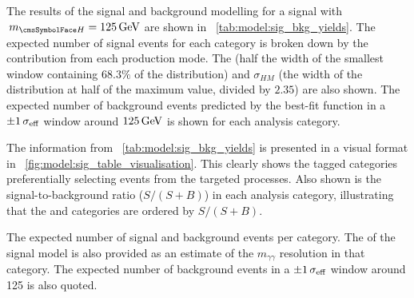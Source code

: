 
The results of the signal and background modelling for a signal with $\mH=125\GeV$ are shown in \Table~\ref{tab:model:sig_bkg_yields}. The expected number of signal events for each category is broken down by the contribution from each production mode. The \effSigma (half the width of the smallest window containing $68.3\%$ of the distribution) and $\sigma_{HM}$ (the width of the distribution at half of the maximum value, divided by $2.35$) are also shown. The expected number of background events predicted by the best-fit function in a $\pm 1 \,\sigma_{\text{eff}}$ window around $125\,\text{Ge\hspace{-.08em}V}$ is shown for each analysis category. 

The information from \Table~\ref{tab:model:sig_bkg_yields} is presented in a visual format in \Fig~\ref{fig:model:sig_table_visualisation}. This clearly shows the tagged categories preferentially selecting events from the targeted processes. Also shown is the signal-to-background ratio ($S/(S+B)$) in each analysis category, illustrating that the \Untagged and \VBFTag categories are ordered by $S/(S+B)$. 

 \begin{table}
  \resizebox{\textwidth}{!}{

}
 \caption{ The expected number of signal and background events per category. The \effSigma of the signal model is also provided as an estimate of the $m_{\gamma\gamma}$ resolution in that category. The expected number of background events in a $\pm 1 \,\sigma_{\text{eff}}$ window around 125 \GeV is also quoted.}
 \label{tab:model:sig_bkg_yields}
\end{table}

